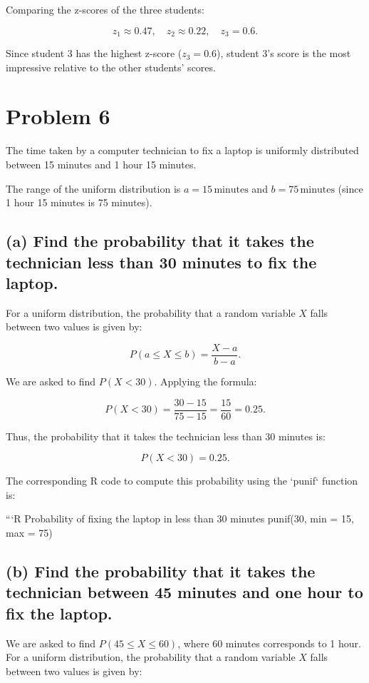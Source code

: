 \documentclass{article} %
\begin{document}
Comparing the z-scores of the three students:

\[
z_1 \approx 0.47, \quad z_2 \approx 0.22, \quad z_3 = 0.6.
\]

Since student 3 has the highest z-score (\( z_3 = 0.6 \)), student 3's score is the most impressive relative to the other students' scores.

\section*{Problem 6}

The time taken by a computer technician to fix a laptop is uniformly distributed between 15 minutes and 1 hour 15 minutes. 

The range of the uniform distribution is \( a = 15 \, \text{minutes} \) and \( b = 75 \, \text{minutes} \) (since 1 hour 15 minutes is 75 minutes).

\subsection*{(a) Find the probability that it takes the technician less than 30 minutes to fix the laptop.}

For a uniform distribution, the probability that a random variable \( X \) falls between two values is given by:

\[
P(a \leq X \leq b) = \frac{X - a}{b - a}.
\]

We are asked to find \( P(X < 30) \). Applying the formula:

\[
P(X < 30) = \frac{30 - 15}{75 - 15} = \frac{15}{60} = 0.25.
\]

Thus, the probability that it takes the technician less than 30 minutes is:

\[
P(X < 30) = 0.25.
\]

The corresponding R code to compute this probability using the `punif` function is:

```R
Probability of fixing the laptop in less than 30 minutes
punif(30, min = 15, max = 75)\

\subsection*{(b) Find the probability that it takes the technician between 45 minutes and one hour to fix the laptop.}

We are asked to find \( P(45 \leq X \leq 60) \), where 60 minutes corresponds to 1 hour. For a uniform distribution, the probability that a random variable \( X \) falls between two values is given by:
\end{document}
